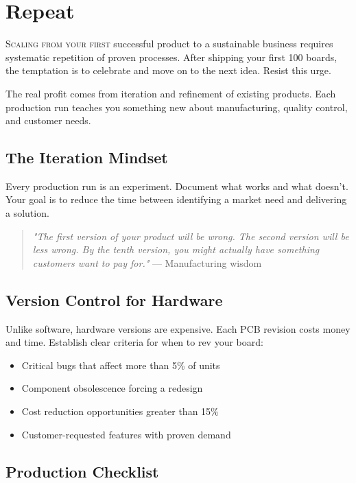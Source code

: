 \chapter{Repeat}

\lettrine{S}{caling from your first} successful product to a sustainable business requires systematic repetition of proven processes. After shipping your first 100 boards, the temptation is to celebrate and move on to the next idea. Resist this urge.

The real profit comes from iteration and refinement of existing products. Each production run teaches you something new about manufacturing, quality control, and customer needs.

\section{The Iteration Mindset}

Every production run is an experiment. Document what works and what doesn't. Your goal is to reduce the time between identifying a market need and delivering a solution.

\begin{quote}
\textit{"The first version of your product will be wrong. The second version will be less wrong. By the tenth version, you might actually have something customers want to pay for."} — Manufacturing wisdom
\end{quote}

\section{Version Control for Hardware}

Unlike software, hardware versions are expensive. Each PCB revision costs money and time. Establish clear criteria for when to rev your board:

\begin{itemize}
\item Critical bugs that affect more than 5\% of units
\item Component obsolescence forcing a redesign
\item Cost reduction opportunities greater than 15\%
\item Customer-requested features with proven demand
\end{itemize}

\section{Production Checklist}


